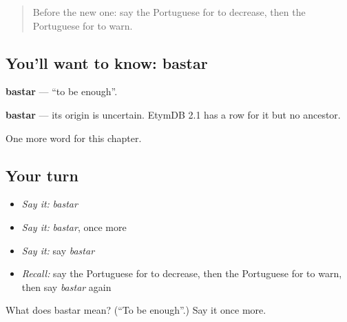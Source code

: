 \begin{quote}
Before the new one: say the Portuguese for to decrease, then the Portuguese for to warn.
\end{quote}

\subsection*{You'll want to know: bastar}
\textbf{bastar} — \textquotedblleft{}to be enough\textquotedblright{}.

\begin{cousinweb}
\textbf{bastar} — its origin is uncertain. EtymDB 2.1 has a row for it but no ancestor.
\end{cousinweb}

\begin{grammarlens}[title={What you've built}]
One more word for this chapter.
\end{grammarlens}

\subsection*{Your turn}
\begin{itemize}
\raggedright
  \item \emph{Say it:} \emph{bastar}
  \item \emph{Say it:} \emph{bastar}, once more
  \item \emph{Say it:} say \emph{bastar}
  \item \emph{Recall:} say the Portuguese for to decrease, then the Portuguese for to warn, then say \emph{bastar} again
\end{itemize}

\begin{tcolorbox}[breakable,colback=teal!4,colframe=teal!35!black,title={Before you move on}]
What does bastar mean? (\textquotedblleft{}To be enough\textquotedblright{}.) Say it once more.
\end{tcolorbox}
